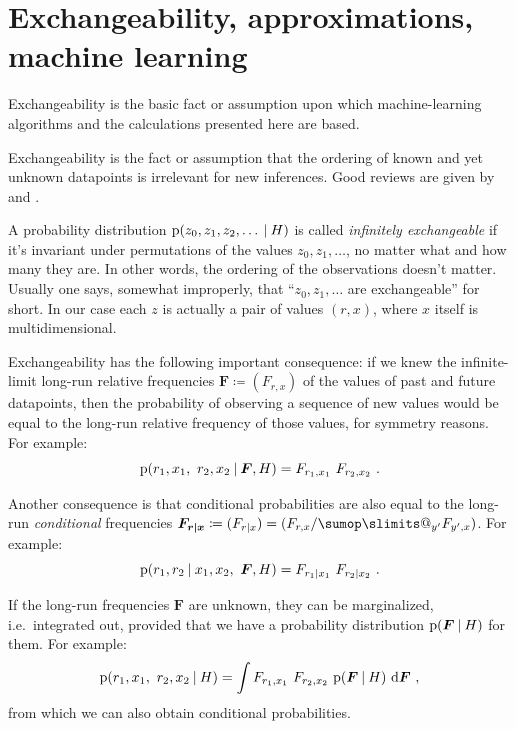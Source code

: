 \documentclass[\ifafour a4paper,12pt,\else a5paper,10pt,\fi%
onecolumn,oneside,article,%
british%
]{memoir}
\makeatletter
\theoremstyle{remark}
\theoremstyle{innote}
\def\sum{\DOTSI\sumop\slimits@}
\newcommand*{\di}{\mathrm{d}}%
\newcommand*{\defd}{\coloneqq}
\newcommand*{\p}{\mathrm{p}}%
\renewcommand*{\|}[1][]{\nonscript\:#1\vert\nonscript\:\mathopen{}}
\renewcommand*{\=}{\TextOrMath\texteq\eq}
\newcommand*{\sect}{\S}%
\newcommand*{\ie}{{i.e.}}
\newcommand*{\yF}{\bm{F}}
\newcommand*{\yFrx}{\yF_{\bm{r\mid x}}}
\makeatother
\begin{document}
\section{Exchangeability, approximations, machine learning}
\label{sec:exchang}

Exchangeability is
the basic fact or assumption upon which machine-learning algorithms and the
calculations presented here are based.

Exchangeability is the fact or assumption that the ordering of
known and yet unknown datapoints is irrelevant for new inferences. Good
reviews are given by \textcite{dawid2013} and
\textcite[\sect~4.2]{bernardoetal1994}.

A probability distribution $\p(z_{0}, z_{1}, z_{2}, \dotsc \| H)$ is called
\emph{infinitely exchangeable} if it's invariant under permutations of the
values $z_{0}, z_{1}, \dotsc$, no matter what and how many they are. In
other words, the ordering of the observations doesn't matter. Usually one
says, somewhat improperly, that \enquote{$z_{0}, z_{1}, \dotsc$ are
  exchangeable} for short. In our case each $z$ is actually a pair of
values $(r,x)$, where $x$ itself is multidimensional.

Exchangeability has the following important consequence: if we knew the
infinite-limit long-run relative frequencies $\yF\defd (F_{r,x})$ of the
values of past and future datapoints, then the probability of observing a
sequence of new values would be equal to the long-run relative frequency of
those values, for symmetry reasons. For example:
\begin{equation}
  \label{eq:prob_freq}
  \p(r_{1},x_{1},\ r_{2},x_{2} \| \yF, H) = F_{r_{1},x_{1}} \ 
  F_{r_{2},x_{2}} \ .
\end{equation}

Another consequence is that conditional probabilities are also equal to the
long-run \emph{conditional} frequencies $\yFrx \defd (F_{r \|x}) =
(F_{r,x}/\sum_{y'}F_{y',x})$. For example:
\begin{equation}
  \label{eq:prob_cond_freq}
  \p(r_{1}, r_{2}\| x_{1}, x_{2},\ \yF, H) = F_{r_{1}\|x_{1}} \ 
  F_{r_{2}\|x_{2}} \ .
\end{equation}

If the long-run frequencies $\yF$ are unknown, they can be marginalized,
\ie\ integrated out, provided that we have a probability distribution
$\p(\yF \| H)$ for them. For example:
\begin{equation}
  \label{eq:prob_freq_integr}
  \p(r_{1},x_{1},\ r_{2},x_{2}\| H) = \int F_{r_{1},x_{1}} \ 
  F_{r_{2},x_{2}} \ \p(\yF \| H)\ \di\yF \ ,
\end{equation}
from which we can also obtain conditional probabilities.
\end{document}
